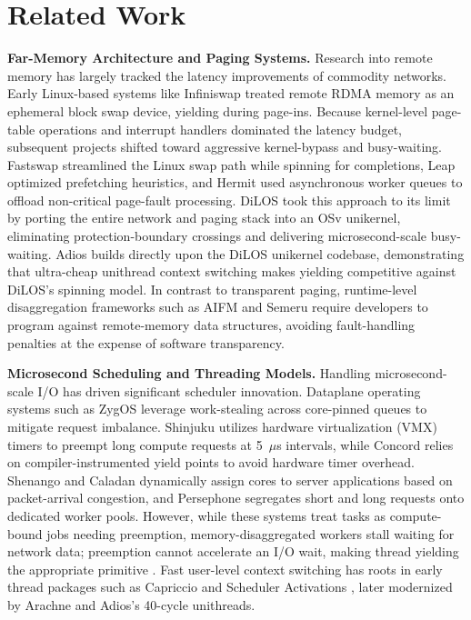 \section{Related Work}
\label{sec:related}

\textbf{Far-Memory Architecture and Paging Systems.}
Research into remote memory has largely tracked the latency improvements of commodity networks. Early Linux-based systems like Infiniswap \cite{infiniswap} treated remote RDMA memory as an ephemeral block swap device, yielding during page-ins. Because kernel-level page-table operations and interrupt handlers dominated the latency budget, subsequent projects shifted toward aggressive kernel-bypass and busy-waiting. Fastswap \cite{fastswap} streamlined the Linux swap path while spinning for completions, Leap \cite{leap} optimized prefetching heuristics, and Hermit \cite{hermit} used asynchronous worker queues to offload non-critical page-fault processing. DiLOS \cite{dilos} took this approach to its limit by porting the entire network and paging stack into an OSv unikernel, eliminating protection-boundary crossings and delivering microsecond-scale busy-waiting. Adios \cite{adios} builds directly upon the DiLOS unikernel codebase, demonstrating that ultra-cheap unithread context switching makes yielding competitive against DiLOS's spinning model. In contrast to transparent paging, runtime-level disaggregation frameworks such as AIFM \cite{aifm} and Semeru \cite{semeru} require developers to program against remote-memory data structures, avoiding fault-handling penalties at the expense of software transparency.

\textbf{Microsecond Scheduling and Threading Models.}
Handling microsecond-scale I/O has driven significant scheduler innovation. Dataplane operating systems such as ZygOS \cite{zygos} leverage work-stealing across core-pinned queues to mitigate request imbalance. Shinjuku \cite{shinjuku} utilizes hardware virtualization (VMX) timers to preempt long compute requests at 5~$\mu$s intervals, while Concord \cite{concord} relies on compiler-instrumented yield points to avoid hardware timer overhead. Shenango \cite{shenango} and Caladan \cite{caladan} dynamically assign cores to server applications based on packet-arrival congestion, and Persephone \cite{persephone} segregates short and long requests onto dedicated worker pools. However, while these systems treat tasks as compute-bound jobs needing preemption, memory-disaggregated workers stall waiting for network data; preemption cannot accelerate an I/O wait, making thread yielding the appropriate primitive \cite{adios}. Fast user-level context switching has roots in early thread packages such as Capriccio \cite{capriccio} and Scheduler Activations \cite{sa}, later modernized by Arachne \cite{arachne} and Adios's 40-cycle unithreads.

